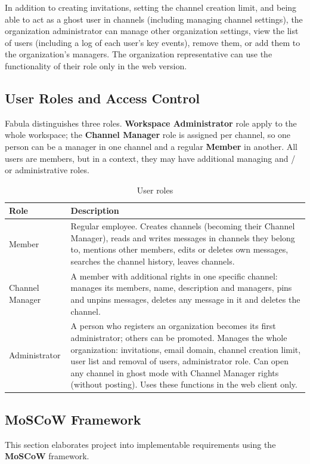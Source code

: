 \documentclass[
    english, %
]{VUMIFPSkursinis}
\begin{document}
In addition to creating invitations, setting the channel creation limit, and being able to act as a ghost user in channels (including managing channel settings), the organization administrator can manage other organization settings, view the list of users (including a log of each user's key events), remove them, or add them to the organization's managers. The organization representative can use the functionality of their role only in the web version.


\subsection{User Roles and Access Control}
\label{features:user_roles}

Fabula distinguishes three roles. \textbf{Workspace Administrator} role apply to the whole workspace; the \textbf{Channel Manager} role is assigned per channel, so one person can be a manager in one channel and a regular \textbf{Member} in another. All users are members, but in a context, they may have additional managing and / or administrative roles.

\begin{table}[H]
\centering
\small
\caption{User roles}
\begin{tabular}{|p{}|p{}|}
\hline
\textbf{Role} & \textbf{Description} \\ \hline
Member & Regular employee. Creates channels (becoming their Channel Manager), reads and writes messages in channels they belong to, mentions other members, edits or deletes own messages, searches the channel history, leaves channels. \\ \hline
Channel Manager & A member with additional rights in one specific channel: manages its members, name, description and managers, pins and unpins messages, deletes any message in it and deletes the channel. \\ \hline
Administrator & A person who registers an organization becomes its first administrator; others can be promoted. Manages the whole organization: invitations, email domain, channel creation limit, user list and removal of users, administrator role. Can open any channel in ghost mode with Channel Manager rights (without posting). Uses these functions in the web client only. \\ \hline
\end{tabular}
\end{table}


\subsection{MoSCoW Framework}
This section elaborates project into implementable requirements using the \textbf{MoSCoW} framework.
\end{document}
